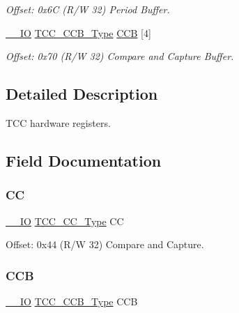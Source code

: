 \begin{DoxyCompactItemize}
\begin{DoxyCompactList}\small\item\em Offset\+: 0x6C (R/W 32) Period Buffer. \end{DoxyCompactList}\item 
\mbox{\hyperlink{core__cm0plus_8h_aec43007d9998a0a0e01faede4133d6be}{\+\_\+\+\_\+\+IO}} \mbox{\hyperlink{union_t_c_c___c_c_b___type}{T\+C\+C\+\_\+\+C\+C\+B\+\_\+\+Type}} \mbox{\hyperlink{struct_tcc_aba8520af432406f53a29252ceb6fab8d}{C\+CB}} \mbox{[}4\mbox{]}
\begin{DoxyCompactList}\small\item\em Offset\+: 0x70 (R/W 32) Compare and Capture Buffer. \end{DoxyCompactList}\end{DoxyCompactItemize}


\subsection{Detailed Description}
T\+CC hardware registers. 

\subsection{Field Documentation}
\mbox{\label{struct_tcc_af4049bf3c19020ebf9dfbeaeca03d6ed}} 
\subsubsection{\texorpdfstring{CC}{CC}}
{\footnotesize\ttfamily \mbox{\hyperlink{core__cm0plus_8h_aec43007d9998a0a0e01faede4133d6be}{\+\_\+\+\_\+\+IO}} \mbox{\hyperlink{union_t_c_c___c_c___type}{T\+C\+C\+\_\+\+C\+C\+\_\+\+Type}} CC}



Offset\+: 0x44 (R/W 32) Compare and Capture. 

\mbox{\label{struct_tcc_aba8520af432406f53a29252ceb6fab8d}} 
\subsubsection{\texorpdfstring{CCB}{CCB}}
{\footnotesize\ttfamily \mbox{\hyperlink{core__cm0plus_8h_aec43007d9998a0a0e01faede4133d6be}{\+\_\+\+\_\+\+IO}} \mbox{\hyperlink{union_t_c_c___c_c_b___type}{T\+C\+C\+\_\+\+C\+C\+B\+\_\+\+Type}} C\+CB}



